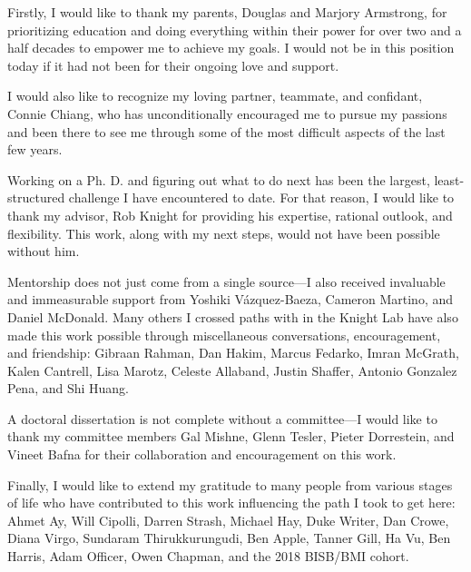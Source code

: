 \begin{frontmatter}
\listoffigures  %
\listoftables   %

%
%
\begin{acknowledgements}

Firstly, I would like to thank my parents, Douglas and Marjory Armstrong, for prioritizing education and doing everything within their power for over two and a half decades to empower me to achieve my goals. I would not be in this position today if it had not been for their ongoing love and support.

I would also like to recognize my loving partner, teammate, and confidant, Connie Chiang, who has unconditionally encouraged me to pursue my passions and been there to see me through some of the most difficult aspects of the last few years.

Working on a Ph. D. and figuring out what to do next has been the largest, least-structured challenge I have encountered to date. For  that reason, I would like to thank my advisor, Rob Knight for providing his expertise, rational outlook, and flexibility. This work, along with my next steps, would not have been possible without him.

Mentorship does not just come from a single source---I also received invaluable and immeasurable support from Yoshiki V\'azquez-Baeza, Cameron Martino, and Daniel McDonald. Many others I crossed paths with in the Knight Lab have also made this work possible through miscellaneous conversations, encouragement, and friendship: Gibraan Rahman, Dan Hakim, Marcus Fedarko, Imran McGrath, Kalen Cantrell, Lisa Marotz, Celeste Allaband, Justin Shaffer, Antonio Gonzalez Pena, and Shi Huang.

A doctoral dissertation is not complete without a committee---I would like to thank my committee members Gal Mishne, Glenn Tesler, Pieter Dorrestein, and Vineet Bafna for their collaboration and encouragement on this work.

Finally, I would like to extend my gratitude to many people from various stages of life who have contributed to this work influencing the path I took to get here: Ahmet Ay, Will Cipolli, Darren Strash, Michael Hay, Duke Writer, Dan Crowe, Diana Virgo, Sundaram Thirukkurungudi, Ben Apple, Tanner Gill, Ha Vu, Ben Harris, Adam Officer, Owen Chapman, and the 2018 BISB/BMI cohort.


\end{acknowledgements}
\end{frontmatter}
